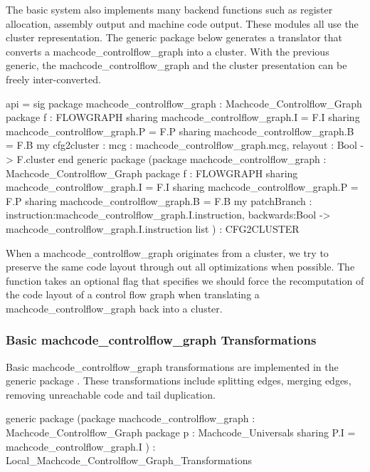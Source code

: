 The basic \MLRISC{} system also implements many backend functions
such as register allocation, assembly output and machine code output.
These modules all use the cluster representation.  The 
generic package  
below generates a translator
that converts a machcode_controlflow_graph into a cluster.  With the previous generic,
the machcode_controlflow_graph and the cluster presentation can be freely inter-converted.
\begin{SML}
 api  = sig
   package machcode_controlflow_graph : Machcode_Controlflow_Graph
   package f   : FLOWGRAPH
      sharing machcode_controlflow_graph.I = F.I
      sharing machcode_controlflow_graph.P = F.P
      sharing machcode_controlflow_graph.B = F.B
   my cfg2cluster : { mcg : machcode_controlflow_graph.mcg, relayout : Bool } -> F.cluster
 end 
 generic package 
   (package machcode_controlflow_graph  : Machcode_Controlflow_Graph
    package f    : FLOWGRAPH
       sharing machcode_controlflow_graph.I = F.I
       sharing machcode_controlflow_graph.P = F.P
       sharing machcode_controlflow_graph.B = F.B
    my patchBranch : {instruction:machcode_controlflow_graph.I.instruction, backwards:Bool} -> 
                         machcode_controlflow_graph.I.instruction list
   ) : CFG2CLUSTER
\end{SML}

When a machcode_controlflow_graph originates from a cluster, we try to preserve
the same code layout through out all optimizations when possible.
The function  takes an optional flag 
that specifies we should force the recomputation of
the code layout of a control flow graph when translating a machcode_controlflow_graph
back into a cluster.

\subsubsection{Basic machcode_controlflow_graph Transformations}

Basic machcode_controlflow_graph transformations are implemented in the generic package 
.  These transformations include splitting edges, merging
edges, removing unreachable code and tail duplication.
\begin{SML}
   generic package 
      (package machcode_controlflow_graph : Machcode_Controlflow_Graph
       package p   : Machcode_Universals
          sharing P.I = machcode_controlflow_graph.I
      ) : Local_Machcode_Controlflow_Graph_Transformations
\end{SML}

